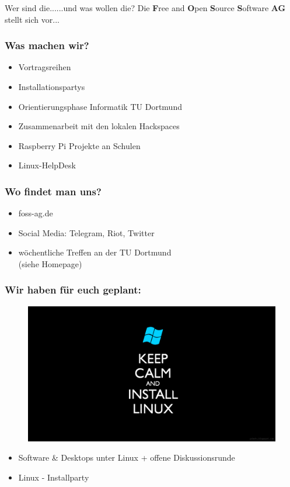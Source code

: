 \begin{frame}{Wer sind die...}{...und was wollen die?}
	Die \textbf{F}ree and \textbf{O}pen \textbf{S}ource \textbf{S}oftware \textbf{AG} stellt sich vor... 
\end{frame}

\begin{frame}
\frametitle{Was machen wir?}
\begin{itemize}
	\item Vortragsreihen
	\item Installationspartys
	\item Orientierungsphase Informatik TU Dortmund
	\item Zusammenarbeit mit den lokalen Hackspaces
	\item Raspberry Pi Projekte an Schulen
	\item Linux-HelpDesk
\end{itemize}
\end{frame}

\begin{frame}
	\frametitle{Wo findet man uns?}
	\begin{itemize}
		\item foss-ag.de
		\item Social Media: Telegram, Riot, Twitter
		\item wöchentliche Treffen an der TU Dortmund\\(siehe Homepage)
	\end{itemize}
\end{frame}

\begin{frame}
\frametitle{Wir haben für euch geplant:}
\begin{figure}
\includegraphics[scale=0.1]{resources/linuxcalm.png}
\end{figure}
	\begin{itemize}
		\item Software \& Desktops unter Linux + offene Diskussionsrunde
		\item Linux - Installparty
	\end{itemize}
\end{frame}

